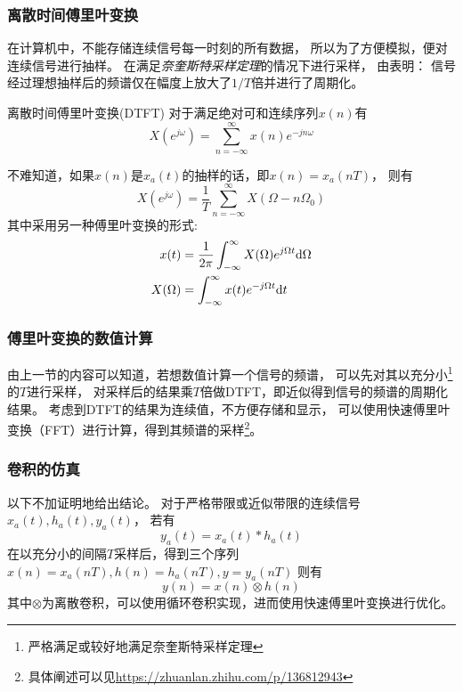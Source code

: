     \subsubsection{离散时间傅里叶变换}
        在计算机中，不能存储连续信号每一时刻的所有数据，
        所以为了方便模拟，便对连续信号进行抽样。
        在满足\emph{奈奎斯特采样定理}的情况下进行采样，
        由表明：
        信号经过理想抽样后的频谱仅在幅度上放大了$1/T$倍并进行了周期化。
        \begin{mydef}{离散时间傅里叶变换(DTFT)}
            对于满足绝对可和连续序列$x(n)$有
            \begin{equation}
                X(e^{j\omega})=\sum_{n=-\infty}^{\infty}x(n)e^{-jn\omega}
            \end{equation}
        \end{mydef}
        不难知道，如果$x(n)$是$x_a(t)$的抽样的话，即$x(n)=x_a(nT)$，
        则有
        \begin{equation*}
            X(e^{j\omega})=\frac{1}{T}\sum_{n=-\infty}^{\infty}X(\Omega-n\Omega_0)
        \end{equation*}
        其中采用另一种傅里叶变换的形式:
        \begin{equation}
            \begin{split}
                x(t)&=\frac{1}{2\pi}\int_{-\infty}^{\infty}X(\Omega)e^{j\Omega t}\text{\upshape d}\Omega\\
                X(\Omega)&=\int_{-\infty}^{\infty}x(t)e^{-j\Omega t}\text{\upshape d} t
            \end{split}
        \end{equation}

    \subsubsection{傅里叶变换的数值计算}
    由上一节的内容可以知道，若想数值计算一个信号的频谱，
    可以先对其以充分小\footnote{严格满足或较好地满足奈奎斯特采样定理}的$T$进行采样，
    对采样后的结果乘$T$倍做DTFT，即近似得到信号的频谱的周期化结果。
    考虑到DTFT的结果为连续值，不方便存储和显示，
    可以使用快速傅里叶变换（FFT）进行计算，得到其频谱的采样\footnote{具体阐述可以见\url{https://zhuanlan.zhihu.com/p/136812943}}。
    
    \subsubsection{卷积的仿真}
    以下不加证明地给出结论。
    对于严格带限或近似带限的连续信号$x_a(t),h_a(t),y_a(t)$，
    若有
    \begin{equation*}
        y_a(t)=x_a(t)*h_a(t)
    \end{equation*}
    在以充分小的间隔$T$采样后，得到三个序列
    $x(n)=x_a(nT),h(n)=h_a(nT),y=y_a(nT)$
    则有
    \begin{equation*}
        y(n)=x(n)\otimes h(n)
    \end{equation*}
    其中$\otimes$为离散卷积，可以使用循环卷积实现，进而使用快速傅里叶变换进行优化。
